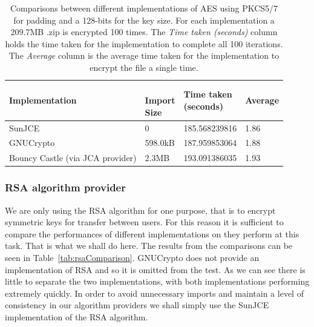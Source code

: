 \documentclass[12pt, titlepage]{article}
\begin{document}
\begin{center}
\begin{table}[H]
    \begin{tabular}{ | l | l | l | l |}
    \hline
    \textbf{Implementation} & \shortstack{\\ \textbf{Import} \\ \textbf{Size}} & \shortstack{\textbf{Time taken} \\ \textbf{(seconds)}} & \textbf{Average} \\ \hline
    
    SunJCE & 0 & 185.568239816 & 1.86 \\ \hline
    
    GNUCrypto & 598.0kB & 187.959853064 & 1.88 \\ \hline
    
    Bouncy Castle (via JCA provider) & 2.3MB & 193.091386035 & 1.93 \\ \hline
    
    \end{tabular}
    \caption{Comparisons between different implementations of AES using PKCS5/7 for padding and a 128-bits for the key size. For each implementation a 209.7MB .zip is encrypted 100 times. The \textit{Time taken (seconds)} column holds the time taken for the implementation to complete all 100 iterations. The \textit{Average} column is the average time taken for the implementation to encrypt the file a single time.} \label{tab:aes.zipComparison}
    \end{table}
\end{center}


\subsubsection{RSA algorithm provider}
We are only using the RSA algorithm for one purpose, that is to encrypt symmetric keys for transfer between users. For this reason it is sufficient to compare the performances of different implementations on they perform at this task. That is what we shall do here.
\newline \indent The results from the comparisons can be seen in Table~\ref{tab:rsaComparison}. GNUCrypto does not provide an implementation of RSA and so it is omitted from the test. As we can see there is little to separate the two implementations, with both implementations performing extremely quickly.
\newline \indent In order to avoid unnecessary imports and maintain a level of consistency in our algorithm providers we shall simply use the SunJCE implementation of the RSA algorithm.
\end{document}
